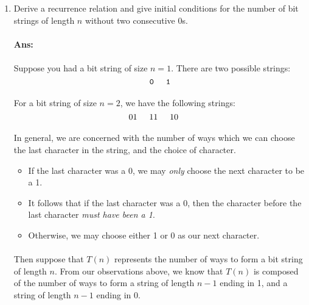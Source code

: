\documentclass[letterpaper,12pt]{article}
\begin{document}
\begin{enumerate}[label=(\arabic*).]
    \item Derive a recurrence relation and give initial conditions for the
        number of bit strings of length $n$ without two consecutive 0s.
        \paragraph{Ans:}
        \paragraph{}Suppose you had a bit string of size $n = 1$. There are two possible strings:
        \[
            \texttt{0} \hspace{5mm} \texttt{1}
        \]
        \paragraph{}For a bit string of size $n = 2$, we have the following strings:
        \[
            01\hspace{5mm}
            11\hspace{5mm}
            10\hspace{5mm}
        \]
        \paragraph{}In general, we are concerned with the number of
        ways which we can choose the last character in the string, and the choice of 
        character. 
        \begin{itemize}
            \item If the last character was a 0, we may \emph{only} choose the next character
                to be a 1.
            \item It follows that if the last character was a 0, then the character before
                the last character \emph{must have been a 1}.
            \item Otherwise, we may choose either 1 or 0 as our next character.
        \end{itemize}
        \paragraph{}Then suppose that $T(n)$ represents the number of ways to form a bit string of length $n$.
        From our observations above, we know that $T(n)$ is composed of the number of ways to form
        a string of length $n-1$ ending in 1, and a string of length $n-1$ ending in 0.

\end{enumerate}
\end{document}
